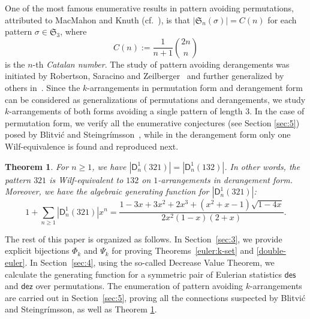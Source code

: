 \documentclass[12pt]{amsart}
\numberwithin{equation}{section}
\theoremstyle{plain}
\newtheorem{theorem}{Theorem}[section]
\theoremstyle{definition}
\newcommand\D{\mathsf{D}}
\def\dez{\mathsf{dez}}
\def\des{\mathsf{des}}
\def\S{\mathfrak{S}}
\begin{document}
One of the most famous enumerative results in pattern avoiding permutations, attributed to MacMahon and Knuth (cf.~\cite{ki,ss}), is that $|\S_n(\sigma)|=C(n)$ for each pattern $\sigma\in\S_3$, where 
$$C(n):=\frac{1}{n+1}\binom{2n}{n}
$$ is the $n$-th {\em Catalan number}. The study of pattern avoiding derangements was  initiated by Robertson,  Saracino and  Zeilberger~\cite{rsz}  and further generalized by others in~\cite{eli,ep,ck}. Since the $k$-arrangements in permutation form and derangement form can be considered as generalizations of permutations and derangements, we study $k$-arrangements of both forms avoiding a single  pattern of length $3$. In the case of permutation form, we verify all the enumerative conjectures (see Section \ref{sec:5}) posed by Blitvi\'c and Steingr\'imsson~\cite{bs}, while in the derangement form only one Wilf-equivalence is found
and reproduced next.
\begin{theorem}\label{der:wilf}
For $n\geq1$, we have $|\D_n^1(321)|=|\D_n^1(132)|$. In other words, the pattern $321$
 is Wilf-equivalent to $132$ on $1$-arrangements in derangement form. Moreover, we have the algebraic generating function for $|\D_n^1(321)|$:
 \begin{equation}\label{gen:321der}
 1+\sum_{n\geq1}|\D_n^1(321)|x^n=\frac{1-3x+3x^2+2x^3+(x^2+x-1)\sqrt{1-4x}}{2x^2(1-x)(2+x)}.
 
 \end{equation}
 \end{theorem}


The rest of this paper is organized as follows. In Section~\ref{sec:3}, we provide explicit bijections $\Phi_k$ and $\Psi_k$ for proving Theorems~\ref{euler:k-set} and \ref{double-euler}. In Section~\ref{sec:4}, using the so-called Decrease Value Theorem, we calculate the generating function for a symmetric pair of Eulerian statistics $\des$ and $\dez$ over permutations. The enumeration of pattern avoiding $k$-arrangements are carried out in Section~\ref{sec:5}, proving all the connections suspected by Blitvi\'c and Steingr\'imsson, as well as 
Theorem \ref{der:wilf}.
\end{document}
